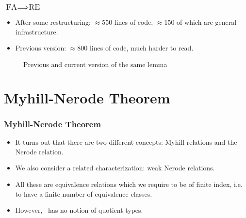 \documentclass{beamer}
\begin{document}
\begin{frame}
    \frametitle{$\mbox{FA} \implies \mbox{RE}$}
    \begin{itemize}
        \item After some restructuring: $\approx 550$ lines of code, $\approx 150$ of which are general infrastructure.
        \item Previous version: $\approx 800$ lines of code, much harder to read.
    \end{itemize}
    \begin{figure}
    \begin{minipage}[t]{0.5\textwidth}

        
    \end{minipage}%
    \begin{minipage}[t]{0.5\textwidth}
        
    \end{minipage}
        \caption{Previous and current version of the same lemma}
    \end{figure}
\end{frame}

\section{Myhill-Nerode Theorem}
\begin{frame}
    \frametitle{Myhill-Nerode Theorem}
    \begin{itemize}
        \item It turns out that there are two different concepts: Myhill relations and the Nerode relation.
        \item We also consider a related characterization: weak Nerode relations.
        \item All these are equivalence relations which we require to be of finite index, i.e. to have a finite number of equivalence classes.
        \item However, \coq\ has no notion of quotient types.
    \end{itemize}
\end{frame}
\end{document}
